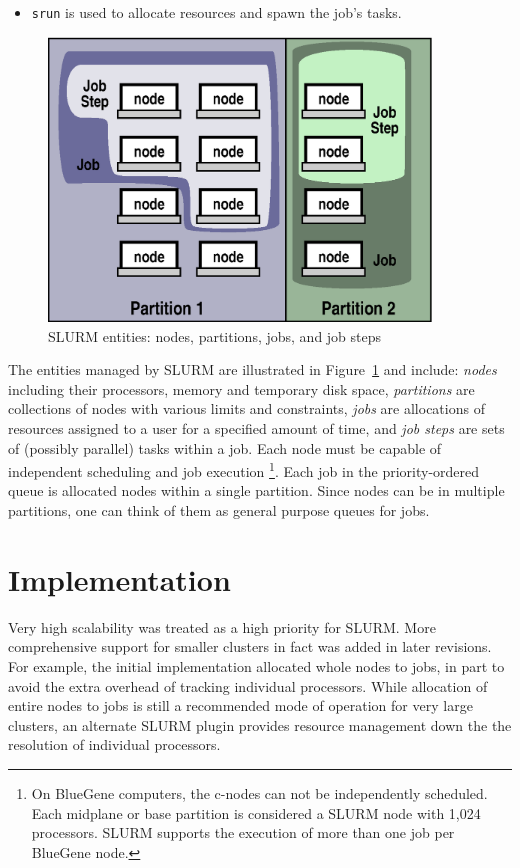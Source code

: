 \documentclass[10pt,onecolumn,times]{../common/llncs}
\begin{document}
{\begin{itemize}
\item {\tt srun} is used to allocate resources and spawn the job's tasks.
\end{itemize}

\begin{figure}[tcb]
\centerline{\includegraphics[width=4in]{../figures/entities.eps}}
\caption{\small SLURM entities: nodes, partitions, jobs, and job steps}
\label{entities}
\end{figure}

The entities managed by SLURM are illustrated in Figure~\ref{entities} 
and include:
{\em nodes} including their processors, memory and temporary disk space,
{\em partitions} are collections of nodes with various limits and constraints,
{\em jobs} are allocations of resources assigned
to a user for a specified amount of time, and
{\em job steps} are sets of (possibly parallel) tasks within a job.
Each node must be capable of independent scheduling and job execution
\footnote{On BlueGene computers, the c-nodes can not be independently 
scheduled. Each midplane or base partition is considered a SLURM node 
with 1,024 processors. SLURM supports the execution of more than one 
job per BlueGene node.}.
Each job in the priority-ordered queue is allocated nodes within a single 
partition.
Since nodes can be in multiple partitions, one can think of them as 
general purpose queues for jobs. 

\section{Implementation}

Very high scalability was treated as a high priority for SLURM. 
More comprehensive support for smaller clusters in fact was 
added in later revisions.
For example, the initial implementation allocated whole nodes 
to jobs, in part to avoid the extra overhead of tracking individual
processors.
While allocation of entire nodes to jobs is still a recommended mode of 
operation for very large clusters, an alternate SLURM plugin provides 
resource management down the the resolution of individual processors.

}
\end{document}
